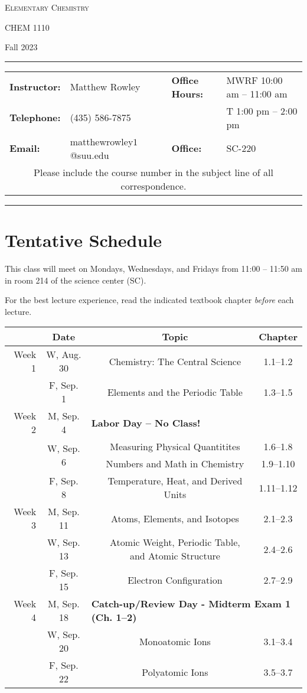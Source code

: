 \documentclass[12pt, letterpaper]{article}
\begin{document}
\begin{center}
	{\Large \textsc{Elementary Chemistry}}
	
	CHEM 1110
\end{center}
\begin{center}
	{\large Fall 2023}
\end{center}
\begin{center}
	\rule{0.99\textwidth}{0.4pt}
	\begin{tabular}{llcll}
		\textbf{Instructor:} & Matthew Rowley           &  & \textbf{Office Hours:} & MWRF 10:00 am -- 11:00 am \\
		\textbf{Telephone:}  & (435) 586-7875           &  &                        & T 1:00 pm -- 2:00 pm    \\
		\textbf{Email:}      & matthewrowley$1$@suu.edu &  & \textbf{Office:}       & SC-220                   \\
		\multicolumn{5}{c}{Please include the course number in the subject line of all correspondence.}
	\end{tabular}
	\rule{0.99\textwidth}{0.4pt}
\end{center}

\section*{Tentative Schedule}
This class will meet on Mondays, Wednesdays, and Fridays from 11:00  -- 11:50
am in room 214 of the science center (SC).


\noindent For the best lecture experience, read the indicated textbook chapter \emph{before} each lecture.

\noindent
\begin{tabular}{rcccc}
& Date && Topic & Chapter\\
\midrule
Week 1 & W, Aug. 30&& Chemistry: The Central Science & 1.1--1.2\\
& F, Sep. 1&& Elements and the Periodic Table & 1.3--1.5\\
\midrule
Week 2 & M, Sep. 4& \multicolumn{3}{l}{\textbf{Labor Day -- No Class!}}\\
& \multirow{2}{*}{W, Sep. 6}& & Measuring Physical Quantitites & 1.6--1.8\\
& & & Numbers and Math in Chemistry & 1.9--1.10\\
& F, Sep. 8&& Temperature, Heat, and Derived Units & 1.11--1.12\\
\midrule
Week 3 & M, Sep. 11&& Atoms, Elements, and Isotopes & 2.1--2.3\\
& W, Sep. 13&& Atomic Weight, Periodic Table, and Atomic Structure & 2.4--2.6\\
& F, Sep. 15&& Electron Configuration & 2.7--2.9\\
\midrule
Week 4 & M, Sep. 18& \multicolumn{3}{l}{\textbf{Catch-up/Review Day - Midterm Exam 1 (Ch. 1--2)}}\\
& W, Sep. 20&& Monoatomic Ions & 3.1--3.4\\
& F, Sep. 22&& Polyatomic Ions & 3.5--3.7\\
\end{tabular}
\end{document}

